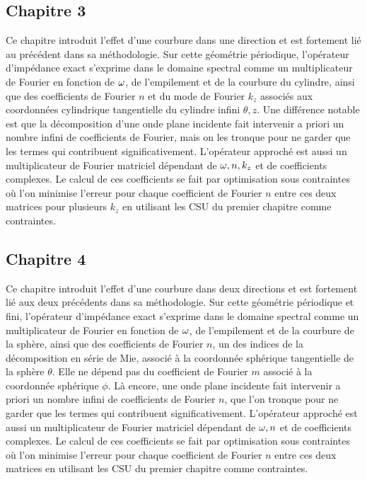 \subsection*{Chapitre 3}
Ce chapitre introduit l'effet d'une courbure dans une direction et est fortement lié au précédent dans sa méthodologie.
Sur cette géométrie périodique, l'opérateur d'impédance exact s'exprime dans le domaine spectral comme un multiplicateur de Fourier en fonction de \(\omega\), de l'empilement et de la courbure du cylindre, ainsi que des coefficients de Fourier \(n\) et du mode de Fourier \(k_z\) associés aux coordonnées cylindrique tangentielle du cylindre infini \(\theta,z\).
Une différence notable est que la décomposition d'une onde plane incidente fait intervenir a priori un nombre infini de coefficients de Fourier, mais on les tronque pour ne garder que les termes qui contribuent significativement.
L'opérateur approché est aussi un multiplicateur de Fourier matriciel dépendant de \(\omega, n, k_z\) et de coefficients complexes.
Le calcul de ces coefficients se fait par optimisation sous contraintes où l'on minimise l'erreur pour chaque coefficient de Fourier \(n\) entre ces deux matrices pour plusieurs \(k_z\) en utilisant les CSU du premier chapitre comme contraintes.

\subsection*{Chapitre 4}
Ce chapitre introduit l'effet d'une courbure dans deux directions et est fortement lié aux deux précédents dans sa méthodologie.
Sur cette géométrie périodique et fini, l'opérateur d'impédance exact s'exprime dans le domaine spectral comme un multiplicateur de Fourier en fonction de \(\omega\), de l'empilement et de la courbure de la sphère, ainsi que des coefficients de Fourier \(n\), un des indices de la décomposition en série de Mie, associé à la coordonnée sphérique tangentielle de la sphère \(\theta\).
Elle ne dépend pas du coefficient de Fourier \(m\) associé à la coordonnée sphérique \(\phi\).
Là encore, une onde plane incidente fait intervenir a priori un nombre infini de coefficients de Fourier \(n\), que l'on tronque pour ne garder que les termes qui contribuent significativement.
L'opérateur approché est aussi un multiplicateur de Fourier matriciel dépendant de \(\omega, n\) et de coefficients complexes.
Le calcul de ces coefficients se fait par optimisation sous contraintes où l'on minimise l'erreur pour chaque coefficient de Fourier \(n\) entre ces deux matrices en utilisant les CSU du premier chapitre comme contraintes.

